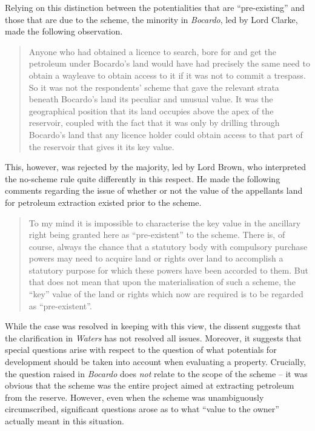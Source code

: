 Relying on this distinction between the potentialities that are ``pre-existing'' and those that are due to the scheme, the minority in \emph{Bocardo}, led by Lord Clarke, made the following observation.

\begin{quote}
Anyone who had obtained a licence to search, bore for and get the petroleum under Bocardo’s
land would have had precisely the same need to obtain a wayleave to obtain access
to it if it was not to commit a trespass. So it was not the respondents' scheme that
gave the relevant strata beneath Bocardo’s land its peculiar and unusual value. It
was the geographical position that its land occupies above the apex of the
reservoir, coupled with the fact that it was only by drilling through Bocardo’s land
that any licence holder could obtain access to that part of the reservoir that gives it
its key value.
\end{quote}

This, however, was rejected by the majority, led by Lord Brown, who interpreted the no-scheme rule quite differently in this respect. He made the following comments regarding the issue of whether or not the value of the appellants land for petroleum extraction existed prior to the scheme.

\begin{quote}To my mind it is impossible to characterise the key value in the ancillary
right being granted here as ``pre-existent'' to the scheme. There is, of course,
always the chance that a statutory body with compulsory purchase powers may
need to acquire land or rights over land to accomplish a statutory purpose for
which these powers have been accorded to them. But that does not mean that upon
the materialisation of such a scheme, the ``key'' value of the land or rights which
now are required is to be regarded as “pre-existent”.
\end{quote}

While the case was resolved in keeping with this view, the dissent suggests that the clarification in \emph{Waters} has not resolved all issues. Moreover, it suggests that special questions arise with respect to the question of what potentials for development should be taken into account when evaluating a property. Crucially, the question raised in \emph{Bocardo} does \emph{not} relate to the scope of the scheme -- it was obvious that the scheme was the entire project aimed at extracting petroleum from the reserve. However, even when the scheme was unambiguously circumscribed, significant questions arose as to what ``value to the owner'' actually meant in this situation. 

